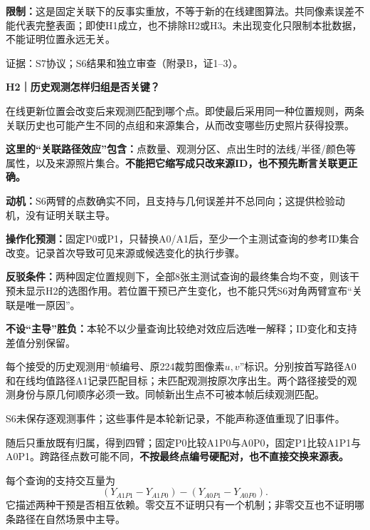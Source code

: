 \documentclass[11pt,a4paper,fontset=none]{ctexart}
\newcommand{\smallhead}[1]{\vspace{4pt}{\large\bfseries\color{hypothesis1}#1}\par}
\newcommand{\docref}[1]{{\small\color{darkgray}证据：#1。}}
\begin{document}
\textbf{限制：}这是固定关联下的反事实重放，不等于新的在线建图算法。共同像素误差不能代表完整表面；即使H1成立，也不排除H2或H3。未出现变化只限制本批数据，不能证明位置永远无关。\par
\docref{S7协议；S6结果和独立审查（附录B，证1--3）}

\newpage
{\LARGE\bfseries\color{hypothesis2}H2｜历史观测怎样归组是否关键？}\par
\begin{hypothesisbox2}[解释与成立前提]
在线更新位置会改变后来观测匹配到哪个点。即使最后采用同一种位置规则，两条关联历史也可能产生不同的点组和来源集合，从而改变哪些历史照片获得投票。

\textbf{这里的“关联路径效应”包含：}点数量、观测分区、点出生时的法线/半径/颜色等属性，以及来源照片集合。\textbf{不能把它缩写成只改来源ID，也不预先断言关联更正确。}

\textbf{动机：}S6两臂的点数确实不同，且支持与几何误差并不总同向；这提供检验动机，没有证明关联主导。
\end{hypothesisbox2}

\begin{predictionbox}[预测与可反驳条件]
\textbf{操作化预测：}固定P0或P1，只替换A0/A1后，至少一个主测试查询的参考ID集合改变。记录首次导致可见来源或候选变化的执行步骤。

\textbf{反驳条件：}两种固定位置规则下，全部8张主测试查询的最终集合均不变，则该干预未显示H2的选图作用。若位置干预已产生变化，也不能只凭S6对角两臂宣布“关联是唯一原因”。

\textbf{不设“主导”胜负：}本轮不以少量查询比较绝对效应后选唯一解释；ID变化和支持差值分别保留。
\end{predictionbox}

\smallhead{设计：先记住每个观测的固定身份}
每个接受的历史观测用“帧编号、原224裁剪图像素$u,v$”标识。分别按首写路径A0和在线均值路径A1记录匹配目标；未匹配观测按原次序出生。两个路径接受的观测身份与原几何顺序必须一致。同帧新出生点不可被本帧后续观测匹配。

S6未保存逐观测事件；这些事件是本轮新记录，不能声称逐值重现了旧事件。

随后只重放既有归属，得到四臂；固定P0比较A1P0与A0P0，固定P1比较A1P1与A0P1。跨路径点数可能不同，\textbf{不按最终点编号硬配对，也不直接交换来源表。}

\begin{comparisonbox}
每个查询的支持交互量为
\[
  (Y_{A1P1}-Y_{A1P0})-(Y_{A0P1}-Y_{A0P0}).
\]
它描述两种干预是否相互依赖。零交互不证明只有一个机制；非零交互也不证明哪条路径在自然场景中主导。
\end{comparisonbox}
\end{document}
